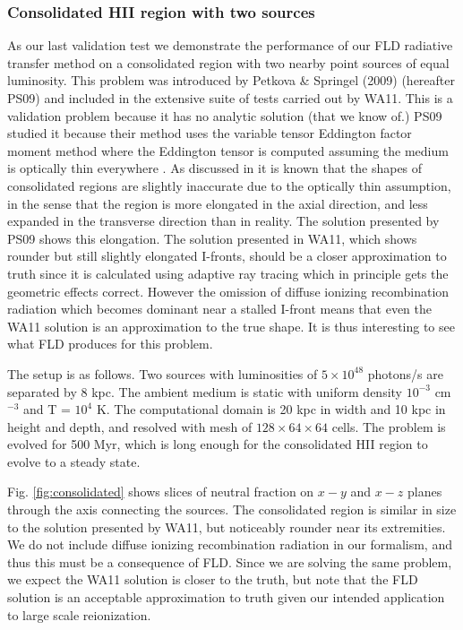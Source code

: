 \subsubsection{Consolidated HII region with two sources}
As our last validation test we demonstrate the performance of our FLD radiative transfer method on a consolidated \hii region with two nearby point sources of equal luminosity. This problem was introduced by Petkova \& Springel (2009) (hereafter PS09) and included in the extensive suite of tests carried out by WA11. This is a validation problem because it has no analytic solution (that we know of.) PS09 studied it because their method uses the variable tensor Eddington factor moment method \citep{StoneMihalasNorman92,NormanAbelPaschos98,HayesNorman2003}  where the Eddington tensor is computed assuming the medium is optically thin everywhere \citep{GnedinAbel2001}. As discussed in \cite{GnedinAbel2001} it is known that the shapes of consolidated \hii regions are slightly inaccurate due to the optically thin assumption, in the sense that the \hii region is  more elongated in the axial direction, and less expanded in the transverse direction than in reality. 
The solution presented by PS09 shows this elongation. The solution presented
in WA11, which shows rounder but still slightly elongated I-fronts, should be a closer approximation to truth since it is calculated using adaptive
ray tracing which in principle gets the geometric effects correct. However the omission of 
diffuse ionizing recombination radiation which becomes dominant near a stalled I-front
means that even the WA11 solution is an approximation to the true shape. It is thus interesting
to see what FLD produces for this problem. 

The setup is as follows. Two sources with luminosities of $5 \times 10^{48}$ photons/s
are separated by 8 kpc. The ambient medium is static with uniform density $10^{-3}$
cm$^{-3}$ and T = $10^4$ K. The computational domain is 20 kpc in width and 10 kpc
in height and depth, and resolved with mesh of $128 \times 64 \times 64$ cells. The 
problem is evolved for 500 Myr, which is long enough for the consolidated HII region to
evolve to a steady state. 

Fig. \ref{fig:consolidated} shows slices of neutral fraction on $x-y$ and $x-z$ planes 
through the axis connecting the sources. The consolidated
\hii region is similar in size to the solution presented by WA11, but noticeably rounder
near its extremities. We do not include diffuse ionizing recombination radiation in our
formalism, and thus this must be a consequence of FLD. Since we are solving the same
problem, we expect the WA11 solution is closer to the truth, but note that the FLD solution is an acceptable approximation to truth given our intended application to large scale reionization. 


